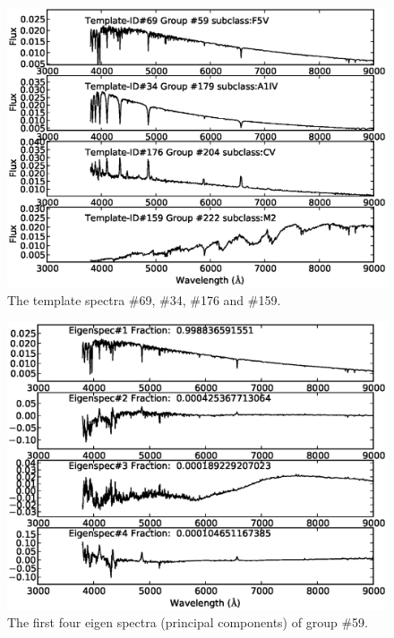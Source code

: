 \documentclass[manuscript]{aastex}
\begin{document}
    \begin{figure}
   \centering
   \includegraphics[width=14cm, angle=0,clip]{f6.eps}
   \caption{The template spectra \#69, \#34, \#176 and \#159.
   }
   \label{Fig6}
\end{figure}

\begin{figure}
   \centering
   \includegraphics[width=14cm, angle=0,clip]{f71.eps}
   \caption{The first four eigen spectra (principal components) of group \#59.
   }
   \label{Fig71}
\end{figure}
\end{document}
